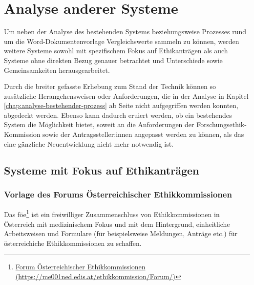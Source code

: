 \documentclass[a4paper,12pt,twoside]{scrreprt}
\begin{document}
\chapter{Analyse anderer Systeme}
\label{chap:analyse-anderer-systeme}

Um neben der Analyse des bestehenden Systems beziehungsweise Prozesses rund um die Word-Dokumentenvorlage Vergleichswerte sammeln zu können, werden weitere Systeme sowohl mit spezifischem Fokus auf Ethikanträgen als auch Systeme ohne direkten Bezug genauer betrachtet und Unterschiede sowie Gemeinsamkeiten herausgearbeitet.

Durch die breiter gefasste Erhebung zum Stand der Technik können so zusätzliche Herangehensweisen oder Anforderungen, die in der Analyse in Kapitel \ref{chap:analyse-bestehender-prozess} ab Seite \pageref{chap:analyse-anderer-systeme} nicht aufgegriffen werden konnten, abgedeckt werden. Ebenso kann dadurch eruiert werden, ob ein bestehendes System die Möglichkeit bietet, soweit an die Anforderungen der Forschungsethik-Kommission sowie der Antragssteller:innen angepasst werden zu können, als das eine gänzliche Neuentwicklung nicht mehr notwendig ist.

\section{Systeme mit Fokus auf Ethikanträgen}
\label{sec:systeme-mit-fokkus-ethikantrage}

\subsection{Vorlage des Forums Österreichischer Ethikkommissionen}
\label{sub-sec:vorlage-föe}

Das \ac{föe}\footnote{\href{https://me001ned.edis.at/ethikkommission/Forum/index.htm}{Forum Österreichischer Ethikkommissionen (\url{https://me001ned.edis.at/ethikkommission/Forum/)}}} ist ein freiwilliger Zusammenschluss von Ethikkommissionen in Österreich mit medizinischem Fokus und mit dem Hintergrund, einheitliche Arbeitsweisen und Formulare (für beispielsweise Meldungen, Anträge etc.) für österreichiche Ethikkommissionen zu schaffen. \cite{ethikkommission_der_medizinischen_universitat_graz_forum_2019}
\end{document}
